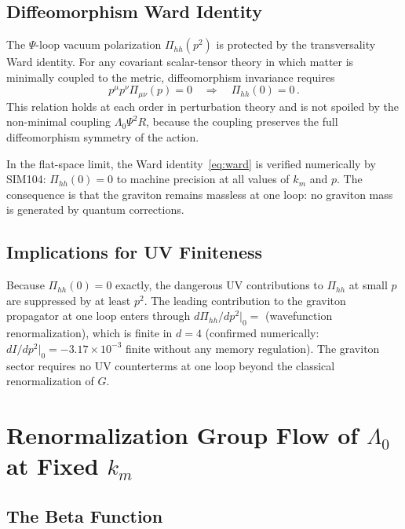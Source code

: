 \documentclass[12pt,a4paper]{article}
\newcommand{\Lz}{{\Lambda_0}}
\newcommand{\km}{{k_m}}
\begin{document}
\subsection{Diffeomorphism Ward Identity}

The $\Psi$-loop vacuum polarization $\Pi_{hh}(p^2)$ is protected by the
transversality Ward identity. For any covariant scalar-tensor theory in which
matter is minimally coupled to the metric, diffeomorphism invariance requires
\begin{equation}
  p^\mu p^\nu \Pi_{\mu\nu}(p) = 0
  \quad \Longrightarrow \quad
  \Pi_{hh}(0) = 0\,.
  \label{eq:ward}
\end{equation}
This relation holds at each order in perturbation theory and is not spoiled
by the non-minimal coupling $\Lz\Psi^2 R$, because the coupling preserves
the full diffeomorphism symmetry of the action.

In the flat-space limit, the Ward identity~\eqref{eq:ward} is verified
numerically by SIM104: $\Pi_{hh}(0) = 0$ to machine precision at all values
of $\km$ and $p$. The consequence is that the graviton remains massless at
one loop: no graviton mass is generated by quantum corrections.

\subsection{Implications for UV Finiteness}

Because $\Pi_{hh}(0) = 0$ exactly, the dangerous UV contributions to
$\Pi_{hh}$ at small $p$ are suppressed by at least $p^2$. The leading
contribution to the graviton propagator at one loop enters through
$d\Pi_{hh}/dp^2|_0 = $ (wavefunction renormalization), which is finite in
$d=4$ (confirmed numerically: $dI/dp^2|_0 = -3.17\times10^{-3}$ finite
without any memory regulation). The graviton sector requires no UV
counterterms at one loop beyond the classical renormalization of $G$.

\section{Renormalization Group Flow of $\Lz$ at Fixed $\km$}
\label{sec:rg}

\subsection{The Beta Function}
\end{document}
